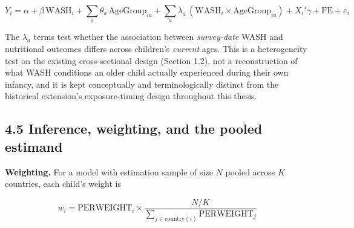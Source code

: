 $$Y_i = \alpha + \beta\,\text{WASH}_i + \sum_a \theta_a\,\text{AgeGroup}_{ia} + \sum_a \lambda_a\,(\text{WASH}_i \times \text{AgeGroup}_{ia}) + X_i'\gamma + \text{FE} + \varepsilon_i$$

The $\lambda_a$ terms test whether the association between \textit{survey-date} WASH and nutritional outcomes differs across children's \textit{current} ages. This is a heterogeneity test on the existing cross-sectional design (Section 1.2), not a reconstruction of what WASH conditions an older child actually experienced during their own infancy, and it is kept conceptually and terminologically distinct from the historical extension's exposure-timing design throughout this thesis.

\subsection*{4.5 Inference, weighting, and the pooled estimand}

\textbf{Weighting.} For a model with estimation sample of size $N$ pooled across $K$ countries, each child's weight is

$$w_i = \text{PERWEIGHT}_i \times \frac{N/K}{\sum_{j \in \text{country}(i)} \text{PERWEIGHT}_j}$$


